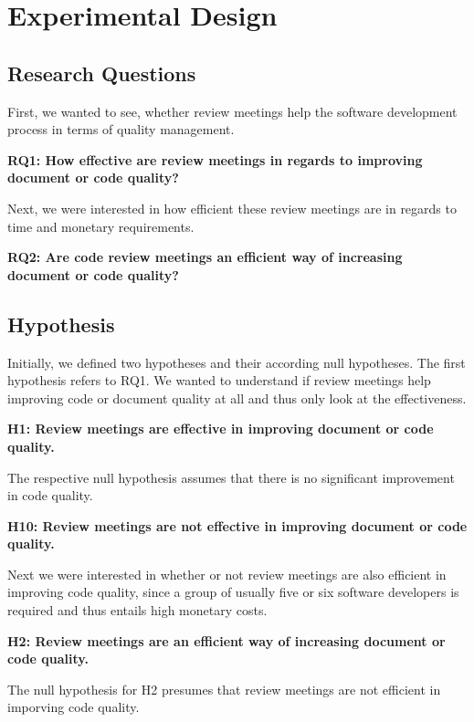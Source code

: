 \section{Experimental Design}

\subsection{Research Questions}
First, we wanted to see, whether review meetings help the software development process in terms of quality management.

\textbf{RQ1: How effective are review meetings in regards to improving document or code quality?}

Next, we were interested in how efficient these review meetings are in regards to time and monetary requirements.

\textbf{RQ2: Are code review meetings an efficient way of increasing document or code quality?}



\subsection{Hypothesis}

Initially, we defined two hypotheses and their according null hypotheses.
The first hypothesis refers to RQ1. We wanted to understand if review meetings help improving code or document quality at all and thus only look at the effectiveness.

\textbf{H1: Review meetings are effective in improving document or code quality.}

The respective null hypothesis assumes that there is no significant improvement in code quality.

\textbf{H10: Review meetings are not effective in improving document or code quality.}

Next we were interested in whether or not review meetings are also efficient in improving code quality, since a group of usually five or six software developers is required and thus entails high monetary costs.

\textbf{H2: Review meetings are an efficient way of increasing document or code quality.}

The null hypothesis for H2 presumes that review meetings are not efficient in imporving code quality.


